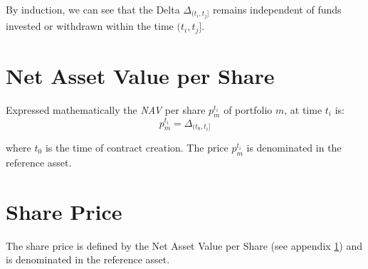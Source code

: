 \documentclass[9pt,oneside]{amsart}
\theoremstyle{plain}
\begin{document}
By induction, we can see that the Delta $\Delta_{(t_i, t_j]}$ remains independent of funds invested or withdrawn within the time $(t_i, t_j]$.

\section{Net Asset Value per Share}\label{app:defnavps}

Expressed mathematically the \textit{NAV} per share $p_{m}^{t_i}$  of portfolio $m$, at time $t_i$ is:
\begin{equation}
	p_{m}^{t_i} = \Delta_{(t_0, t_i]}
\end{equation}

where $t_0$ is the time of contract creation. The price $p_{m}^{t_i}$ is denominated in the reference asset. 

\section{Share Price}\label{app:defshareprice}

The share price is defined by the Net Asset Value per Share (see appendix \ref{app:defnavps}) and is denominated in the reference asset.
	
\end{document}
